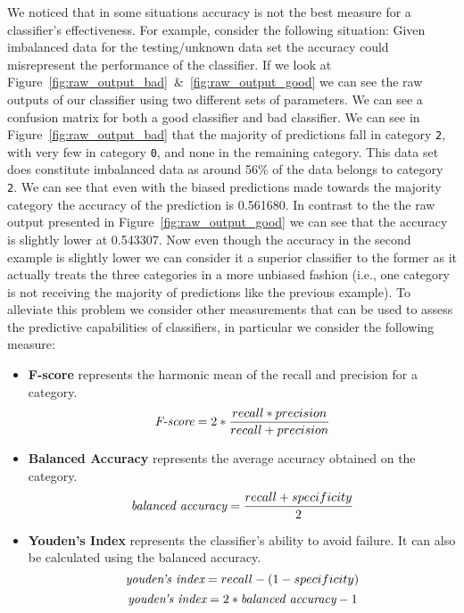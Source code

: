 We noticed that in some situations accuracy is not the best measure for a classifier's effectiveness. For example, consider the following situation: Given imbalanced data for the testing/unknown data set the accuracy could misrepresent the performance of the classifier. If we look at Figure~\ref{fig:raw_output_bad}~\&~\ref{fig:raw_output_good} we can see the raw outputs of our classifier using two different sets of parameters. We can see a confusion matrix for both a good classifier and bad classifier. We can see in Figure~\ref{fig:raw_output_bad} that the majority of predictions fall in category \texttt{2}, with very few in category \texttt{0}, and none in the remaining category. This data set does constitute imbalanced data as around 56\% of the data belongs to category \texttt{2}. We can see that even with the biased predictions made towards the majority category the accuracy of the prediction is 0.561680. In contrast to the the raw output presented in Figure~\ref{fig:raw_output_good} we can see that the accuracy is slightly lower at 0.543307. Now even though the accuracy in the second example is slightly lower we can consider it a superior classifier to the former as it actually treats the three categories in a more unbiased fashion (i.e., one category is not receiving the majority of predictions like the previous example). To alleviate this problem we consider other measurements that can be used to assess the predictive capabilities of classifiers, in particular we consider the following measure:

\begin{itemize}
  \item \textbf{F-score} represents the harmonic mean of the recall and precision for a category.~\cite{SJS06}
  \begin{equation}
    \emph{$\text{F-score} = 2*\frac{recall * precision}{recall + precision}$}
    \label{equ:f_score}
  \end{equation}

  \item \textbf{Balanced Accuracy} represents the average accuracy obtained on the category.~\cite{BOSB10, SJS06}
  \begin{equation}
    \emph{$\text{balanced accuracy} = \frac{recall + specificity}{2}$}
    \label{equ:balanced_area_under_curve}
  \end{equation}

  \item \textbf{Youden's Index} represents the classifier's ability to avoid failure. It can also be calculated using the balanced accuracy.~\cite{SJS06}
  \begin{equation}
    \emph{$\text{youden's index} = recall - ( 1 - specificity)$}
    \label{equ:youden_index_a}
  \end{equation}
  \begin{equation}
    \emph{$\text{youden's index} = 2 * \text{balanced accuracy} - 1$}
    \label{equ:youden_index_b}
  \end{equation}
\end{itemize}

